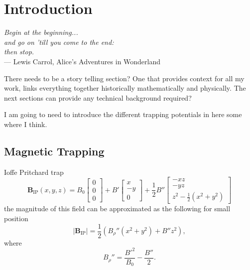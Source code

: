 
\chapter{Introduction} %

\label{ch:intro} %


\begin{flushright}{\slshape    
Begin at the beginning...\\
and go on 'till you come to the end:\\
then stop.} \\ \medskip
--- Lewis Carrol, Alice's Adventures in Wonderland
\end{flushright}

\bigskip


There needs to be a story telling section?
One that provides context for all my work, links everything together historically mathematically and physically.
The next sections can provide any technical background required?


I am going to need to introduce the different trapping potentials in here some where I think.

\section{Magnetic Trapping} \label{sec:intromag}

Ioffe Pritchard trap
\begin{equation}
    \mathbf{B}_{\mathrm{IP}}(x,y,z) = B_0 \begin{bmatrix} 0\\ 0\\ 0 \end{bmatrix}
                      + B' \begin{bmatrix} x\\-y\\ 0 \end{bmatrix}
                      + \frac{1}{2}B'' \begin{bmatrix}-xz\\-yz\\ z^2-\frac{1}{2}\left(x^2+y^2\right) \end{bmatrix}
\end{equation}
the magnitude of this field can be approximated as the following for small position
\begin{equation}
    \left| \mathbf{B}_{\mathrm{IP}} \right| = \frac{1}{2}\left(B_{\rho}''\left(x^2+y^2\right) + B''z^2\right), \label{eq:ipmag}
\end{equation}
where 
\begin{equation*}
    B_\rho''= \frac{B'^2}{B_0} - \frac{B''}{2}. 
\end{equation*}


